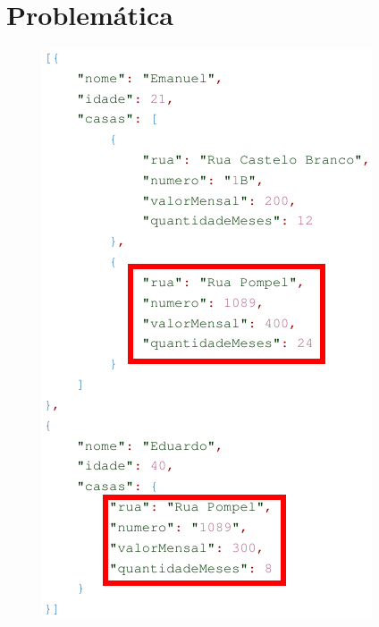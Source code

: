 \documentclass{beamer} %
\begin{document}
\section{Problemática}

\begin{frame}
    \begin{figure}
        \centering
        \includegraphics[height=\textheight]{imagens/BJSON-casa-duplicada.png}
        \label{fig:bjson-casa-duplicada}
    \end{figure}
\end{frame}

\end{document}
